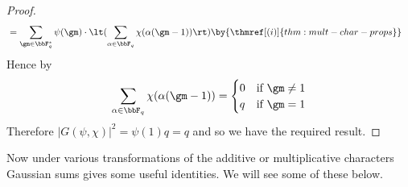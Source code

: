 \begin{proof}
\begin{align*}
                     & = \sum_{\gm\in\bbF_q^*}\psi(\gm) \cdot \lt(\sum_{\alpha\in\bbF_q}\chi(\alpha(\gm-1))\rt)                                                      \by{\thmref[(i)]{thm:mult-char-props}}
  \end{align*}
  Hence by  $$\sum_{\alpha\in\bbF_q}\chi(\alpha(\gm-1))=\begin{cases}
      0 & \text{if $\gm\neq 1$} \\
      q & \text{if $\gm=1$}
    \end{cases}$$
  Therefore $|G(\psi,\chi)|^2=\psi(1)q=q$ and so we have the required result.
\end{proof}
Now under various transformations of the additive or multiplicative characters Gaussian sums gives some useful identities. We will see some of these below.

